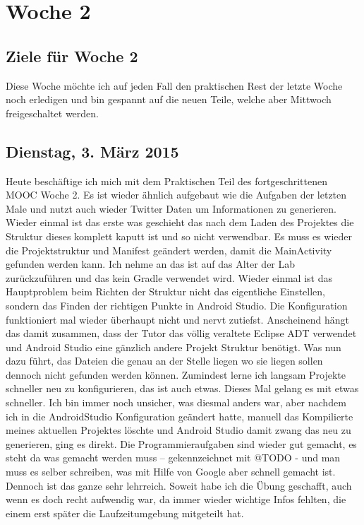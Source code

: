 \documentclass[12pt,a4paper,bibliography=totocnumbered,listof=totocnumbered]{scrartcl}
\begin{document}
\pagebreak

\section{Woche 2}

\subsection{Ziele für Woche 2 }
Diese Woche möchte ich auf jeden Fall den praktischen Rest der letzte Woche noch erledigen und bin gespannt auf die neuen Teile, welche aber Mittwoch freigeschaltet werden. 

\subsection{Dienstag, 3. März 2015}
Heute beschäftige ich mich mit dem Praktischen Teil des fortgeschrittenen MOOC Woche 2.
Es ist wieder ähnlich aufgebaut wie die Aufgaben der letzten Male und nutzt auch wieder Twitter Daten um Informationen zu generieren. Wieder einmal ist das erste was geschieht das nach dem Laden des Projektes die Struktur dieses komplett kaputt ist und so nicht verwendbar. Es muss es wieder die Projektstruktur und Manifest geändert werden, damit die MainActivity gefunden werden kann. Ich nehme an das ist auf das Alter der Lab zurückzuführen und das kein Gradle verwendet wird. 
Wieder einmal ist das Hauptproblem beim Richten der Struktur nicht das eigentliche Einstellen, sondern das Finden der richtigen Punkte in Android Studio. Die Konfiguration funktioniert mal wieder überhaupt nicht und nervt zutiefst. Anscheinend hängt das damit zusammen, dass der Tutor das völlig veraltete Eclipse ADT verwendet und Android Studio eine gänzlich andere Projekt Struktur benötigt. Was nun dazu führt, das Dateien die genau an der Stelle liegen wo sie liegen sollen dennoch nicht gefunden werden können. Zumindest lerne ich langsam Projekte schneller neu zu konfigurieren, das ist auch etwas. Dieses Mal gelang es mit etwas schneller. Ich bin immer noch unsicher, was diesmal anders war, aber nachdem ich in die AndroidStudio Konfiguration geändert hatte, manuell das Kompilierte meines aktuellen Projektes löschte und Android Studio damit zwang das neu zu generieren, ging es direkt. 
Die Programmieraufgaben sind wieder gut gemacht, es steht da was gemacht werden muss – gekennzeichnet mit @TODO - und man muss es selber schreiben, was mit Hilfe von Google aber schnell gemacht ist. Dennoch ist das ganze sehr lehrreich. 
Soweit habe ich die Übung geschafft, auch wenn es doch recht aufwendig war, da immer wieder wichtige Infos fehlten, die einem erst später die Laufzeitumgebung mitgeteilt hat. 
\end{document}

